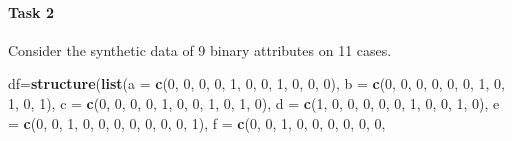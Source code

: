 \documentclass[
]{book}
\newenvironment{Shaded}{\begin{snugshade}}{\end{snugshade}}
\newcommand{\AttributeTok}[1]{\textcolor[rgb]{0.13,0.29,0.53}{#1}}
\newcommand{\DecValTok}[1]{\textcolor[rgb]{0.00,0.00,0.81}{#1}}
\newcommand{\FunctionTok}[1]{\textcolor[rgb]{0.13,0.29,0.53}{\textbf{#1}}}
\newcommand{\NormalTok}[1]{#1}
\newcommand{\OtherTok}[1]{\textcolor[rgb]{0.56,0.35,0.01}{#1}}
\theoremstyle{definition}
\theoremstyle{definition}
\theoremstyle{definition}
\theoremstyle{definition}
\theoremstyle{remark}
\begin{document}
\hypertarget{task-2-1}{%
\paragraph*{Task 2}\label{task-2-1}}

Consider the synthetic data of 9 binary attributes on 11 cases.

\begin{Shaded}
\begin{Highlighting}[]
\NormalTok{df}\OtherTok{=}\FunctionTok{structure}\NormalTok{(}\FunctionTok{list}\NormalTok{(}\AttributeTok{a =} \FunctionTok{c}\NormalTok{(}\DecValTok{0}\NormalTok{, }\DecValTok{0}\NormalTok{, }\DecValTok{0}\NormalTok{, }\DecValTok{0}\NormalTok{, }\DecValTok{1}\NormalTok{, }\DecValTok{0}\NormalTok{, }\DecValTok{0}\NormalTok{, }\DecValTok{1}\NormalTok{, }\DecValTok{0}\NormalTok{, }\DecValTok{0}\NormalTok{, }\DecValTok{0}\NormalTok{), }\AttributeTok{b =} \FunctionTok{c}\NormalTok{(}\DecValTok{0}\NormalTok{, }
\DecValTok{0}\NormalTok{, }\DecValTok{0}\NormalTok{, }\DecValTok{0}\NormalTok{, }\DecValTok{0}\NormalTok{, }\DecValTok{0}\NormalTok{, }\DecValTok{1}\NormalTok{, }\DecValTok{0}\NormalTok{, }\DecValTok{1}\NormalTok{, }\DecValTok{0}\NormalTok{, }\DecValTok{1}\NormalTok{), }\AttributeTok{c =} \FunctionTok{c}\NormalTok{(}\DecValTok{0}\NormalTok{, }\DecValTok{0}\NormalTok{, }\DecValTok{0}\NormalTok{, }\DecValTok{0}\NormalTok{, }\DecValTok{1}\NormalTok{, }\DecValTok{0}\NormalTok{, }\DecValTok{0}\NormalTok{, }\DecValTok{1}\NormalTok{, }
\DecValTok{0}\NormalTok{, }\DecValTok{1}\NormalTok{, }\DecValTok{0}\NormalTok{), }\AttributeTok{d =} \FunctionTok{c}\NormalTok{(}\DecValTok{1}\NormalTok{, }\DecValTok{0}\NormalTok{, }\DecValTok{0}\NormalTok{, }\DecValTok{0}\NormalTok{, }\DecValTok{0}\NormalTok{, }\DecValTok{0}\NormalTok{, }\DecValTok{1}\NormalTok{, }\DecValTok{0}\NormalTok{, }\DecValTok{0}\NormalTok{, }\DecValTok{1}\NormalTok{, }\DecValTok{0}\NormalTok{), }\AttributeTok{e =} \FunctionTok{c}\NormalTok{(}\DecValTok{0}\NormalTok{, }\DecValTok{0}\NormalTok{, }
\DecValTok{1}\NormalTok{, }\DecValTok{0}\NormalTok{, }\DecValTok{0}\NormalTok{, }\DecValTok{0}\NormalTok{, }\DecValTok{0}\NormalTok{, }\DecValTok{0}\NormalTok{, }\DecValTok{0}\NormalTok{, }\DecValTok{0}\NormalTok{, }\DecValTok{1}\NormalTok{), }\AttributeTok{f =} \FunctionTok{c}\NormalTok{(}\DecValTok{0}\NormalTok{, }\DecValTok{0}\NormalTok{, }\DecValTok{1}\NormalTok{, }\DecValTok{0}\NormalTok{, }\DecValTok{0}\NormalTok{, }\DecValTok{0}\NormalTok{, }\DecValTok{0}\NormalTok{, }\DecValTok{0}\NormalTok{, }\DecValTok{0}\NormalTok{, }

\end{Highlighting}
\end{Shaded}
\end{document}
